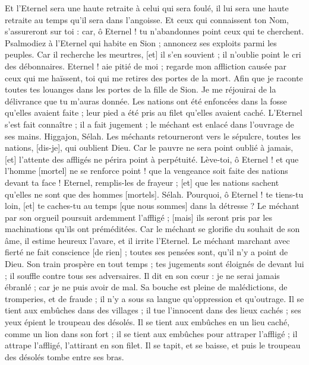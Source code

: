 \begin{multicols}{2}
Et l'Eternel sera une haute retraite à celui qui sera foulé, il lui sera une haute retraite au temps qu'il sera dans l'angoisse.
Et ceux qui connaissent ton Nom, s'assureront sur toi : car, ô Eternel ! tu n'abandonnes point ceux qui te cherchent.
Psalmodiez à l'Eternel qui habite en Sion ; annoncez ses exploits parmi les peuples.
Car il recherche les meurtres, [et] il s'en souvient ; il n'oublie point le cri des débonnaires.
Eternel ! aie pitié de moi ; regarde mon affliction causée par ceux qui me haïssent, toi qui me retires des portes de la mort.
Afin que je raconte toutes tes louanges dans les portes de la fille de Sion. Je me réjouirai de la délivrance que tu m'auras donnée.
Les nations ont été enfoncées dans la fosse qu'elles avaient faite ; leur pied a été pris au filet qu'elles avaient caché.
L'Eternel s'est fait connaître ; il a fait jugement ; le méchant est enlacé dans l'ouvrage de ses mains. Higgajon, Sélah.
Les méchants retourneront vers le sépulcre, toutes les nations, [dis-je], qui oublient Dieu.
Car le pauvre ne sera point oublié à jamais, [et] l'attente des affligés ne périra point à perpétuité.
Lève-toi, ô Eternel ! et que l'homme [mortel] ne se renforce point ! que la vengeance soit faite des nations devant ta face !
Eternel, remplis-les de frayeur ; [et] que les nations sachent qu'elles ne sont que des hommes [mortels]. Sélah.
\VerseOne{}Pourquoi, ô Eternel ! te tiens-tu loin, [et] te caches-tu au temps [que nous sommes] dans la détresse ?
Le méchant par son orgueil poursuit ardemment l'affligé ; [mais] ils seront pris par les machinations qu'ils ont préméditées.
Car le méchant se glorifie du souhait de son âme, il estime heureux l'avare, et il irrite l'Eternel.
Le méchant marchant avec fierté ne fait conscience [de rien] ; toutes ses pensées sont, qu'il n'y a point de Dieu.
Son train prospère en tout temps ; tes jugements sont éloignés de devant lui ; il souffle contre tous ses adversaires.
Il dit en son cœur : je ne serai jamais ébranlé ; car je ne puis avoir de mal.
Sa bouche est pleine de malédictions, de tromperies, et de fraude ; il n'y a sous sa langue qu'oppression et qu'outrage.
Il se tient aux embûches dans des villages ; il tue l'innocent dans des lieux cachés ; ses yeux épient le troupeau des désolés.
Il se tient aux embûches en un lieu caché, comme un lion dans son fort ; il se tient aux embûches pour attraper l'affligé ; il attrape l'affligé, l'attirant en son filet.
Il se tapit, et se baisse, et puis le troupeau des désolés tombe entre ses bras.

\end{multicols}
